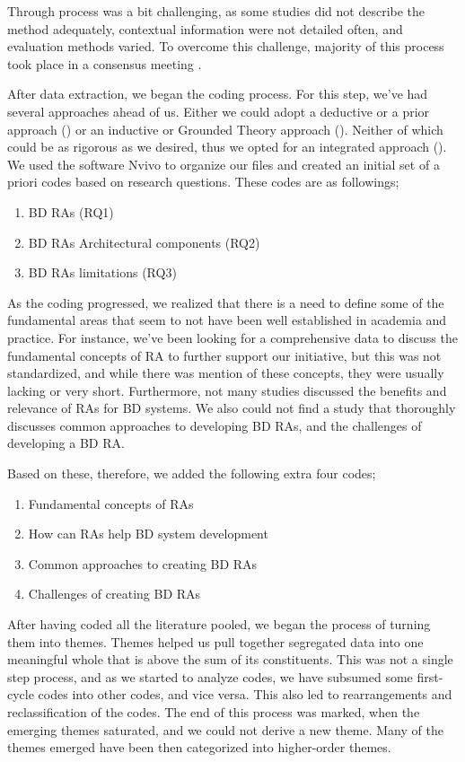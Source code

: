 \documentclass[review]{elsarticle}
\begin{document}
Through process was a bit challenging, as some studies did not describe the method adequately, contextual information were not detailed often, and evaluation methods varied. To overcome this challenge, majority of this process took place in a consensus meeting \cite{dyba2007applying}.

After data extraction, we began the coding process. For this step, we've had several approaches ahead of us. Either we could adopt a deductive or a prior approach (\cite{miles1994qualitative}) or an inductive or Grounded Theory approach (\cite{corbin2014basics}). Neither of which could be as rigorous as we desired, thus we opted for an integrated approach (\cite{lofland1971analyzing}). We used the software Nvivo to organize our files and created an initial set of a priori codes based on research questions. These codes are as followings;

\begin{enumerate}
    \item BD RAs (RQ1)
    \item BD RAs Architectural components (RQ2)
    \item BD RAs limitations (RQ3)
\end{enumerate}

As the coding progressed, we realized that there is a need to define some of the fundamental areas that seem to not have been well established in academia and practice. For instance, we've been looking for a comprehensive data to discuss the fundamental concepts of RA to further support our initiative, but this was not standardized, and while there was mention of these concepts, they were usually lacking or very short. Furthermore, not many studies discussed the benefits and relevance of RAs for BD systems. We also could not find a study that thoroughly discusses common approaches to developing BD RAs, and the challenges of developing a BD RA.

Based on these, therefore, we added the following extra four codes;
\begin{enumerate}
    \item Fundamental concepts of RAs
    \item How can RAs help BD system development
    \item Common approaches to creating BD RAs
    \item Challenges of creating BD RAs
\end{enumerate}

After having coded all the literature pooled, we began the process of turning them into themes. Themes helped us pull together segregated data into one meaningful whole that is above the sum of its constituents. This was not a single step process, and as we started to analyze codes, we have subsumed some first-cycle codes into other codes, and vice versa. This also led to rearrangements and reclassification of the codes. The end of this process was marked, when the emerging themes saturated, and we could not derive a new theme. Many of the themes emerged have been then categorized into higher-order themes. 
\end{document}
